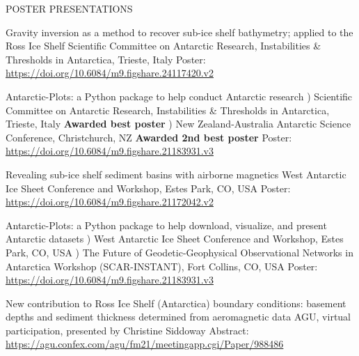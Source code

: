 \documentclass{ExpressiveResume}
\begin{document}
\noindent POSTER PRESENTATIONS \newline
\begin{cventries}

    {Gravity inversion as a method to recover sub-ice shelf bathymetry; applied to the Ross Ice Shelf}
    {Scientific Committee on Antarctic Research, Instabilities \&
        Thresholds in Antarctica, Trieste, Italy}
    {Poster: \url{https://doi.org/10.6084/m9.figshare.24117420.v2}}
    {}
    {}

    \talk{}
    {Antarctic-Plots: a Python package to help conduct Antarctic research}
    {) Scientific Committee on Antarctic Research, Instabilities \&
        Thresholds in Antarctica, Trieste, Italy
        \newline \hspace*{1em} \textbf{Awarded best poster}
    ) New Zealand-Australia Antarctic Science Conference, Christchurch, NZ
        \newline \hspace*{1em} \textbf{Awarded 2nd best poster}}
    {Poster: \url{https://doi.org/10.6084/m9.figshare.21183931.v3}}
    {}
    {}



    {Revealing sub-ice shelf sediment basins with airborne magnetics}
    {West Antarctic Ice Sheet Conference and Workshop, Estes Park, CO, USA}
    {Poster: \url{https://doi.org/10.6084/m9.figshare.21172042.v2}}
    {}
    {}

    \talk{} %
    {Antarctic-Plots: a Python package to help download, visualize, and present Antarctic datasets}
    {) West Antarctic Ice Sheet Conference and Workshop, Estes Park, CO, USA
        ) The Future of Geodetic-Geophysical Observational Networks in
        Antarctica Workshop (SCAR-INSTANT), Fort Collins, CO, USA
    }
    {Poster: \url{https://doi.org/10.6084/m9.figshare.21183931.v3}}
    {}
    {}

    {New contribution to Ross Ice Shelf (Antarctica) boundary conditions: basement depths and sediment thickness determined from aeromagnetic data}
    {AGU, virtual participation, presented by Christine Siddoway}
    {Abstract: \url{https://agu.confex.com/agu/fm21/meetingapp.cgi/Paper/988486}}
    {}
    {}


\end{cventries}
\end{document}

